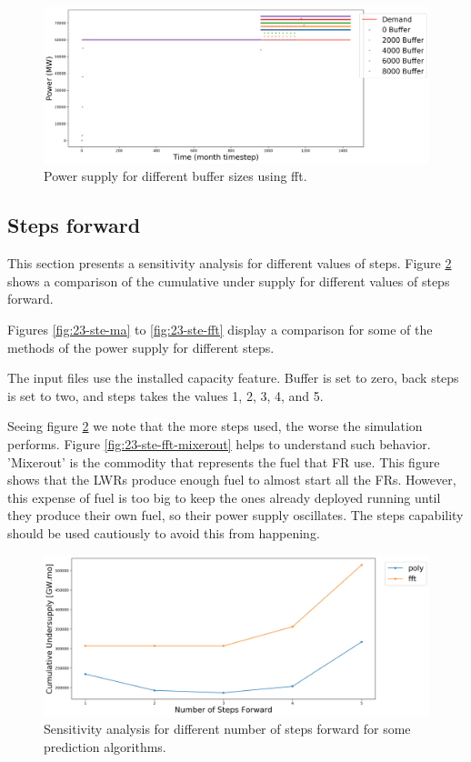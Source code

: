 \documentclass[11pt]{article}
\begin{document}
\begin{figure}[H]
	\centering
	\includegraphics[width=\textwidth]{23-figures/23-power-buffer-fft.png} 
	\hfill
    \caption{Power supply for different buffer sizes using fft.}
	\label{fig:23-buf-fft}
\end{figure}

\subsection{Steps forward}

This section presents a sensitivity analysis for different values of steps.
Figure \ref{fig:23-steps} shows a comparison of the cumulative under supply for different values of steps forward.

Figures \ref{fig:23-ste-ma} to \ref{fig:23-ste-fft} display a comparison for some of the methods of the power supply for different steps.

The input files use the installed capacity feature. Buffer is set to zero, back steps is set to two, and steps takes the values 1, 2, 3, 4, and 5.

Seeing figure \ref{fig:23-steps} we note that the more steps used, the worse the simulation performs. Figure \ref{fig:23-ste-fft-mixerout} helps to understand such behavior. 'Mixerout' is the commodity that represents the fuel that FR use. This figure shows that the LWRs produce enough fuel to almost start all the FRs. However, this expense of fuel is too big to keep the ones already deployed running until they produce their own fuel, so their power supply oscillates. The steps capability should be used cautiously to avoid this from happening.

\begin{figure}[H]
	\centering
	\includegraphics[width=\textwidth]{23-figures/23-sens-steps.png} 
	\hfill
	\caption{Sensitivity analysis for different number of steps forward for some prediction algorithms.}
	\label{fig:23-steps}
\end{figure}
\end{document}
